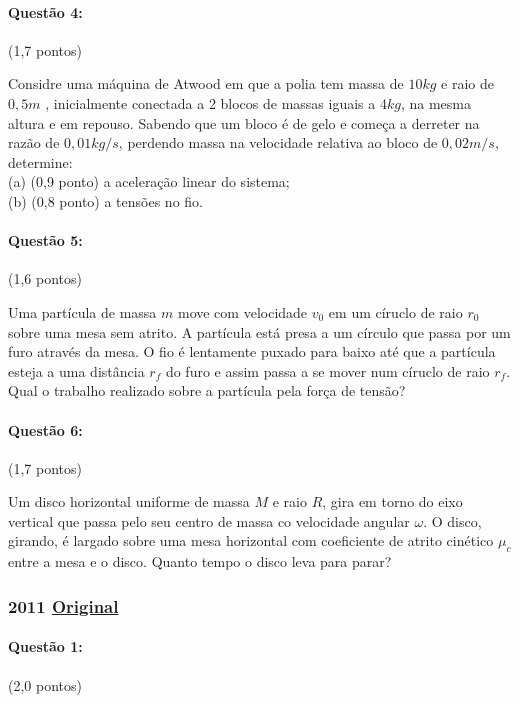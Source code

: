 \documentclass[12pt,a4paper]{article}
\newcommand{\original}[1]{\tiny \href{#1}{Original} \normalsize}
\begin{document}
\paragraph{Questão 4:} (1,7 pontos) 

Considre uma máquina de Atwood em que a polia tem massa de $10kg$ e raio de $0,5m$ , inicialmente conectada a 2 blocos de massas iguais a $4kg$, na mesma altura e em repouso. Sabendo que um bloco é de gelo e começa a derreter na razão de $0,01kg/s$, perdendo massa na velocidade relativa ao bloco de $0,02m/s$, determine:\\
(a) (0,9 ponto) a aceleração linear do sistema;\\
(b) (0,8 ponto) a tensões no fio.

\paragraph{Questão 5:} (1,6 pontos) 

Uma partícula de massa $m$ move com velocidade $v_0$ em um círuclo de raio $r_0$ sobre uma mesa sem atrito. A partícula está presa a um círculo que passa por um furo através da mesa. O fio é lentamente puxado para baixo até que a partícula esteja a uma distância $r_f$ do furo e assim passa a se mover num círuclo de raio $r_f$. Qual o trabalho realizado sobre a partícula pela força de tensão?\\

\paragraph{Questão 6:} (1,7 pontos) 

Um disco horizontal uniforme de massa $M$ e raio $R$, gira em torno do eixo vertical que passa pelo seu centro de massa co velocidade angular $\omega$. O disco, girando, é largado sobre uma mesa horizontal com coeficiente de atrito cinético $\mu_c$ entre a mesa e o disco. Quanto tempo o disco leva para parar?\\

\newpage

\subsubsection{2011 \original{https://drive.google.com/file/d/1lGgUuQHGgyjriMwmD4zSKD_-Q-E9rIwp/view?usp=sharing}}

\paragraph{Questão 1:} (2,0 pontos)
\end{document}
